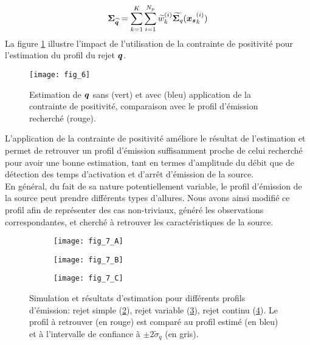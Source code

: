 {{  \begin{equation}
	 {\bm{\Sigma}}_{\widehat{{\bm{q}}}} = \sum\limits_{k=1}^K \sum\limits_{i=1}^{N_p} \widetilde{w}_k^{(i)} {\widetilde{\bm{\Sigma}_q}}({\bm{x_s}}_k^{(i)})
  \end{equation}
}
  La figure \ref{fig_6_AE} illustre l'impact de l'utilisation de la contrainte de positivité pour l'estimation du profil du rejet ${\bm{q}}$.
  
 \begin{figure}[h!]
 	\centering
 	\texttt{[image: fig\_6]}
 	\caption{Estimation de ${\bm{q}}$ sans (vert) et avec (bleu) application de la contrainte de positivité, comparaison avec le profil d'émission recherché (rouge).}
 	\label{fig_6_AE}
 \end{figure}
 
 L'application de la contrainte de positivité améliore le résultat de l'estimation et permet de retrouver un profil d'émission suffisamment proche de celui recherché pour avoir une bonne estimation, tant en termes d'amplitude du débit que de détection des temps d'activation et d'arrêt d'émission de la source.\\
 
 En général, du fait de sa nature potentiellement variable, le profil d'émission de la source peut prendre différents types d'allures. Nous avons ainsi modifié ce profil afin de représenter des cas non-triviaux, généré les observations correspondantes, et cherché à retrouver les caractéristiques de la source. \\
 
  \begin{figure}[h!]
  	\centering
  	\begin{subfigure}[t]{0.5\textwidth}
  		\centering
  		\texttt{[image: fig\_7\_A]}
  		\caption{}
  		\label{fig_AE_7_A}
  	\end{subfigure}%
  	\begin{subfigure}[t]{0.5\textwidth}
  		\centering
  		\texttt{[image: fig\_7\_B]}
  		\caption{}
  		\label{fig_AE_7_B}
  	\end{subfigure}
  	\begin{subfigure}[t]{0.5\textwidth}
  		\centering
  		\texttt{[image: fig\_7\_C]}
  		\caption{}
  		\label{fig_AE_7_C}
  	\end{subfigure} 
  	
  	\caption{Simulation et résultats d'estimation pour différents profils d'émission: rejet simple (\ref{fig_AE_7_A}), rejet variable (\ref{fig_AE_7_B}), rejet continu (\ref{fig_AE_7_C}). Le profil à retrouver (en rouge) est comparé au profil estimé (en bleu) et à l'intervalle de confiance à $\pm 2 \widetilde{\sigma}_q$ (en gris).}
  	\label{fig_AE_7}	
  \end{figure}
  
}
